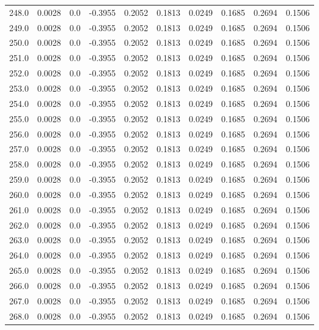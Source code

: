 \begin{longtable}{lrrrrrrrrr}
248.0 & 0.0028 & 0.0 & -0.3955 & 0.2052 & 0.1813 & 0.0249 & 0.1685 & 0.2694 & 0.1506 \\
249.0 & 0.0028 & 0.0 & -0.3955 & 0.2052 & 0.1813 & 0.0249 & 0.1685 & 0.2694 & 0.1506 \\
250.0 & 0.0028 & 0.0 & -0.3955 & 0.2052 & 0.1813 & 0.0249 & 0.1685 & 0.2694 & 0.1506 \\
251.0 & 0.0028 & 0.0 & -0.3955 & 0.2052 & 0.1813 & 0.0249 & 0.1685 & 0.2694 & 0.1506 \\
252.0 & 0.0028 & 0.0 & -0.3955 & 0.2052 & 0.1813 & 0.0249 & 0.1685 & 0.2694 & 0.1506 \\
253.0 & 0.0028 & 0.0 & -0.3955 & 0.2052 & 0.1813 & 0.0249 & 0.1685 & 0.2694 & 0.1506 \\
254.0 & 0.0028 & 0.0 & -0.3955 & 0.2052 & 0.1813 & 0.0249 & 0.1685 & 0.2694 & 0.1506 \\
255.0 & 0.0028 & 0.0 & -0.3955 & 0.2052 & 0.1813 & 0.0249 & 0.1685 & 0.2694 & 0.1506 \\
256.0 & 0.0028 & 0.0 & -0.3955 & 0.2052 & 0.1813 & 0.0249 & 0.1685 & 0.2694 & 0.1506 \\
257.0 & 0.0028 & 0.0 & -0.3955 & 0.2052 & 0.1813 & 0.0249 & 0.1685 & 0.2694 & 0.1506 \\
258.0 & 0.0028 & 0.0 & -0.3955 & 0.2052 & 0.1813 & 0.0249 & 0.1685 & 0.2694 & 0.1506 \\
259.0 & 0.0028 & 0.0 & -0.3955 & 0.2052 & 0.1813 & 0.0249 & 0.1685 & 0.2694 & 0.1506 \\
260.0 & 0.0028 & 0.0 & -0.3955 & 0.2052 & 0.1813 & 0.0249 & 0.1685 & 0.2694 & 0.1506 \\
261.0 & 0.0028 & 0.0 & -0.3955 & 0.2052 & 0.1813 & 0.0249 & 0.1685 & 0.2694 & 0.1506 \\
262.0 & 0.0028 & 0.0 & -0.3955 & 0.2052 & 0.1813 & 0.0249 & 0.1685 & 0.2694 & 0.1506 \\
263.0 & 0.0028 & 0.0 & -0.3955 & 0.2052 & 0.1813 & 0.0249 & 0.1685 & 0.2694 & 0.1506 \\
264.0 & 0.0028 & 0.0 & -0.3955 & 0.2052 & 0.1813 & 0.0249 & 0.1685 & 0.2694 & 0.1506 \\
265.0 & 0.0028 & 0.0 & -0.3955 & 0.2052 & 0.1813 & 0.0249 & 0.1685 & 0.2694 & 0.1506 \\
266.0 & 0.0028 & 0.0 & -0.3955 & 0.2052 & 0.1813 & 0.0249 & 0.1685 & 0.2694 & 0.1506 \\
267.0 & 0.0028 & 0.0 & -0.3955 & 0.2052 & 0.1813 & 0.0249 & 0.1685 & 0.2694 & 0.1506 \\
268.0 & 0.0028 & 0.0 & -0.3955 & 0.2052 & 0.1813 & 0.0249 & 0.1685 & 0.2694 & 0.1506 \\

\end{longtable}
